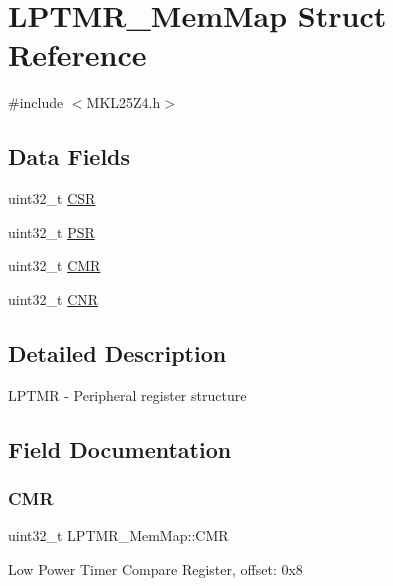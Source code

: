\hypertarget{struct_l_p_t_m_r___mem_map}{}\section{L\+P\+T\+M\+R\+\_\+\+Mem\+Map Struct Reference}
\label{struct_l_p_t_m_r___mem_map}


{\ttfamily \#include $<$M\+K\+L25\+Z4.\+h$>$}

\subsection*{Data Fields}
\begin{DoxyCompactItemize}
\item 
uint32\+\_\+t \hyperlink{struct_l_p_t_m_r___mem_map_a4dcb593756f09d67e3d064d95e3f2d68}{C\+SR}
\item 
uint32\+\_\+t \hyperlink{struct_l_p_t_m_r___mem_map_a05f0c5c90722e5a1757c262c818d2462}{P\+SR}
\item 
uint32\+\_\+t \hyperlink{struct_l_p_t_m_r___mem_map_a28ac745e518d40e34527f5cf70f75d70}{C\+MR}
\item 
uint32\+\_\+t \hyperlink{struct_l_p_t_m_r___mem_map_adda036ea26ea5cc89d7957779c5680f0}{C\+NR}
\end{DoxyCompactItemize}


\subsection{Detailed Description}
L\+P\+T\+MR -\/ Peripheral register structure 

\subsection{Field Documentation}
\mbox{\label{struct_l_p_t_m_r___mem_map_a28ac745e518d40e34527f5cf70f75d70}} 
\subsubsection{\texorpdfstring{C\+MR}{CMR}}
{\footnotesize\ttfamily uint32\+\_\+t L\+P\+T\+M\+R\+\_\+\+Mem\+Map\+::\+C\+MR}

Low Power Timer Compare Register, offset\+: 0x8 \mbox{\label{struct_l_p_t_m_r___mem_map_adda036ea26ea5cc89d7957779c5680f0}} 
